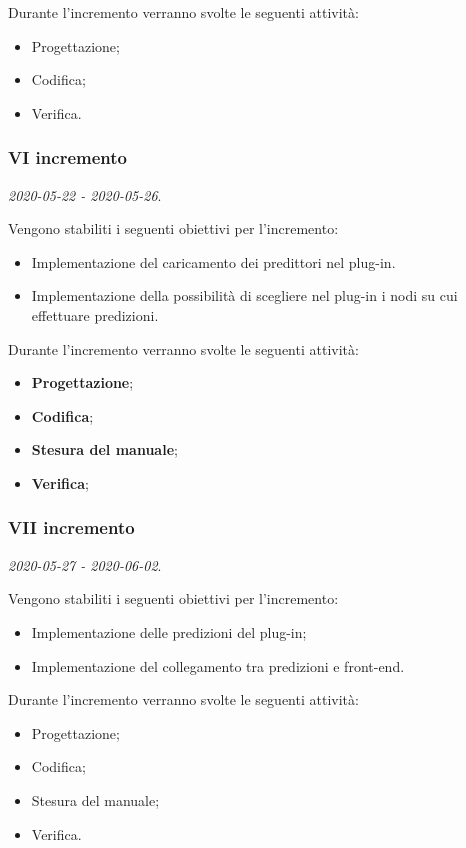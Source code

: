 \documentclass[../piano-di-progetto.tex]{subfiles}
\begin{document}
Durante l'incremento verranno svolte le seguenti attività: 
\begin{itemize}
    \item Progettazione;
    \item Codifica;
    \item Verifica.
\end{itemize}

\subsubsection{VI incremento}
\emph{2020-05-22 - 2020-05-26}. 
 
 Vengono stabiliti i seguenti obiettivi per l'incremento:
 \begin{itemize}
     \item Implementazione del caricamento dei predittori nel plug-in.
     \item Implementazione della possibilità di scegliere nel plug-in i nodi su cui effettuare predizioni.
 \end{itemize}

Durante l'incremento verranno svolte le seguenti attività: 
\begin{itemize}
    \item \textbf{Progettazione};
    \item \textbf{Codifica};
    \item \textbf{Stesura del manuale};
    \item \textbf{Verifica};
\end{itemize}

\subsubsection{VII incremento}
\emph{2020-05-27 - 2020-06-02}. 
 
 Vengono stabiliti i seguenti obiettivi per l'incremento:
 \begin{itemize}
    \item Implementazione delle predizioni del plug-in;
    \item Implementazione del collegamento tra predizioni e front-end.

\end{itemize}

Durante l'incremento verranno svolte le seguenti attività: 
\begin{itemize}
    \item Progettazione;
    \item Codifica;
    \item Stesura del manuale;
    \item Verifica.
\end{itemize}
\end{document}
